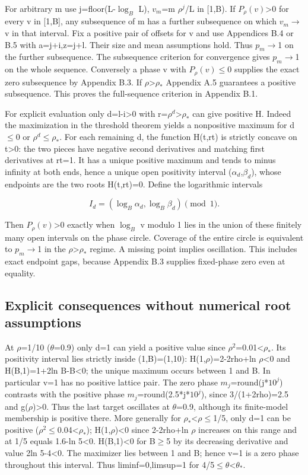 \documentclass[11pt]{article}
\begin{document}
For arbitrary m use j=floor(L-$\log_B$ L), $v_{m}$=m $\rho^{j}$/L in [1,B). If $P_\rho(v)$>0 for every v in [1,B], any subsequence of m has a further subsequence on which $v_{m}$\ensuremath{\to}v in that interval. Fix a positive pair of offsets for v and use Appendices B.4 or B.5 with a=j+i,z=j+l. Their size and mean assumptions hold. Thus $p_m$\ensuremath{\to}1 on the further subsequence. The subsequence criterion for convergence gives $p_m$\ensuremath{\to}1 on the whole sequence. Conversely a phase v with $P_\rho(v)$\ensuremath{\leq}0 supplies the exact zero subsequence by Appendix B.3. If $\rho$>$\rho_{*}$ Appendix A.5 guarantees a positive subsequence. This proves the full-sequence criterion in Appendix B.1.

For explicit evaluation only d=l-i>0 with r=$\rho^{d}$>$\rho_{*}$ can give positive H. Indeed the maximization in the threshold theorem yields a nonpositive maximum for d\ensuremath{\leq}0 or $\rho^{d}$\ensuremath{\leq}$\rho_{*}$. For each remaining d, the function H(t,rt) is strictly concave on t>0: the two pieces have negative second derivatives and matching first derivatives at rt=1. It has a unique positive maximum and tends to minus infinity at both ends, hence a unique open positivity interval ($\alpha_{d}$,$\beta_{d}$), whose endpoints are the two roots H(t,rt)=0. Define the logarithmic intervals

\[
I_d=(\log_B\alpha_d,\log_B\beta_d)\pmod{1}.
\]

Then $P_\rho(v)$>0 exactly when $\log_B$ v modulo 1 lies in the union of these finitely many open intervals on the phase circle. Coverage of the entire circle is equivalent to $p_m$\ensuremath{\to}1 in the $\rho$>$\rho_{*}$ regime. A missing point implies oscillation. This includes exact endpoint gaps, because Appendix B.3 supplies fixed-phase zero even at equality.

\subsection{Explicit consequences without numerical root assumptions}

At $\rho$=1/10 ($\theta$=0.9) only d=1 can yield a positive value since $\rho^{2}$=0.01<$\rho_{*}$. Its positivity interval lies strictly inside (1,B)=(1,10): H(1,$\rho$)=2-2rho+ln $\rho$<0 and H(B,1)=1+2ln B-B<0; the unique maximum occurs between 1 and B. In particular v=1 has no positive lattice pair. The zero phase $m_{j}$=round(j*$10^{j}$) contrasts with the positive phase $m_{j}$=round(2.5*j*$10^{j}$), since 3/(1+2rho)=2.5 and g($\rho$)>0. Thus the last target oscillates at $\theta$=0.9, although its finite-model membership is positive there. More generally for $\rho_{*}$<$\rho$\ensuremath{\leq}1/5, only d=1 can be positive ($\rho^{2}$\ensuremath{\leq}0.04<$\rho_{*}$); H(1,$\rho$)<0 since 2-2rho+ln $\rho$ increases on this range and at 1/5 equals 1.6-ln 5<0. H(B,1)<0 for B\ensuremath{\geq}5 by its decreasing derivative and value 2ln 5-4<0. The maximizer lies between 1 and B; hence v=1 is a zero phase throughout this interval. Thus liminf=0,limsup=1 for 4/5\ensuremath{\leq}$\theta$<$\theta_{*}$.
\end{document}
